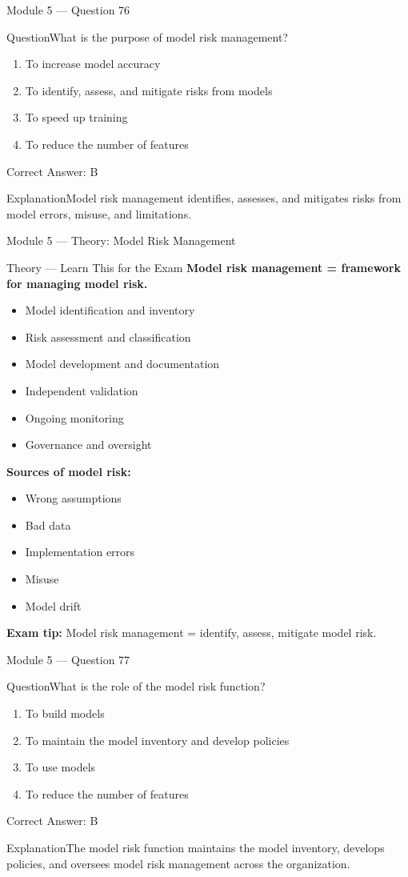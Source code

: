 \documentclass[aspectratio=169,10pt]{beamer}
\newcommand{\question}[1]{\begin{block}{Question}#1\end{block}}
\newcommand{\options}[4]{%
	\begin{enumerate}[label=\Alph*.,leftmargin=*]
		\item #1
		\item #2
		\item #3
		\item #4
	\end{enumerate}
}
\newcommand{\answerbox}[1]{\begin{exampleblock}{Correct Answer: #1}\end{exampleblock}}
\newcommand{\explain}[1]{\begin{block}{Explanation}#1\end{block}}
\newcommand{\theory}[1]{%
	\begin{block}{Theory --- Learn This for the Exam}
		\small #1
	\end{block}
}
\begin{document}
	\begin{frame}{Module 5 --- Question 76}
		\question{What is the purpose of model risk management?}
		\options{To increase model accuracy}{To identify, assess, and mitigate risks from models}{To speed up training}{To reduce the number of features}
		\answerbox{B}
		\explain{Model risk management identifies, assesses, and mitigates risks from model errors, misuse, and limitations.}
	\end{frame}
	
	\begin{frame}{Module 5 --- Theory: Model Risk Management}
		\theory{
			\textbf{Model risk management = framework for managing model risk.}
			\begin{itemize}
				\item Model identification and inventory
				\item Risk assessment and classification
				\item Model development and documentation
				\item Independent validation
				\item Ongoing monitoring
				\item Governance and oversight
			\end{itemize}
			\textbf{Sources of model risk:}
			\begin{itemize}
				\item Wrong assumptions
				\item Bad data
				\item Implementation errors
				\item Misuse
				\item Model drift
			\end{itemize}
			\textbf{Exam tip:} Model risk management = identify, assess, mitigate model risk.
		}
	\end{frame}
	
	\begin{frame}{Module 5 --- Question 77}
		\question{What is the role of the model risk function?}
		\options{To build models}{To maintain the model inventory and develop policies}{To use models}{To reduce the number of features}
		\answerbox{B}
		\explain{The model risk function maintains the model inventory, develops policies, and oversees model risk management across the organization.}
	\end{frame}
	
\end{document}
